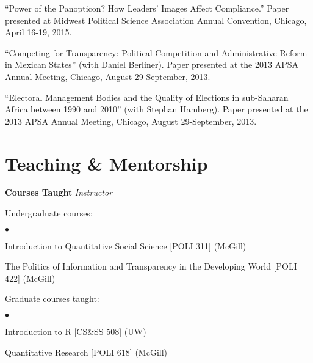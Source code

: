 \documentclass[margin,line]{res}
\newenvironment{list1}{
  \begin{list}{\ding{113}}{%
      \setlength{\itemsep}{0in}
      \setlength{\parsep}{0in} \setlength{\parskip}{0in}
      \setlength{\topsep}{0in} \setlength{\partopsep}{0in} 
      \setlength{\leftmargin}{0.17in}}}{\end{list}}
\newenvironment{list2}{
  \begin{list}{$\bullet$}{%
      \setlength{\itemsep}{0in}
      \setlength{\parsep}{0in} \setlength{\parskip}{0in}
      \setlength{\topsep}{0in} \setlength{\partopsep}{0in} 
      \setlength{\leftmargin}{0.2in}}}{\end{list}}
\begin{document}
{\begin{resume}
``Power of the Panopticon? How Leaders' Images Affect Compliance.''
Paper presented at Midwest Political Science Association Annual
Convention, Chicago, April 16-19, 2015.

``Competing for Transparency: Political Competition and Administrative
Reform in Mexican States'' (with Daniel Berliner). Paper presented at
the 2013 APSA Annual Meeting, Chicago, August 29-September, 2013.

``Electoral Management Bodies and the Quality of Elections in
 sub-Saharan Africa between 1990 and 2010'' (with Stephan Hamberg).
Paper presented at
the 2013 APSA Annual Meeting, Chicago, August 29-September, 2013.


\section{\sc Teaching \& Mentorship}
\textbf{Courses Taught}
{\em Instructor}\\
\vspace{-.1in}
\begin{list1}
\item[] Undergraduate courses:
   \begin{list2}
   \item[] Introduction to Quantitative Social Science [POLI 311]
     (McGill)
   \item[] The Politics of Information and Transparency in the
     Developing World [POLI 422] (McGill)
\end{list2}

 \item[] Graduate courses taught:
   \begin{list2}
   \item[] Introduction to R  [CS\&SS 508] (UW)
   \item[] Quantitative Research [POLI 618] (McGill)
\end{list2}
\end{list1}


\end{resume}}
\end{document}
